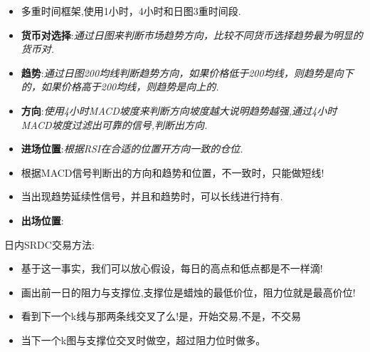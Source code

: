
%


\begin{itemize}
\item 多重时间框架,使用1小时，4小时和日图3重时间段.
\item \textbf{货币对选择}:\textit{通过日图来判断市场趋势方向，比较不同货币选择趋势最为明显的货币对.}
\item \textbf{趋势}:\textit{通过日图200均线判断趋势方向，如果价格低于200均线，则趋势是向下的，如果价格高于200均线，则趋势是向上的.}
\item \textbf{方向}:\textit{使用4小时MACD坡度来判断方向坡度越大说明趋势越强,通过4小时MACD坡度过滤出可靠的信号,判断出方向.}
\item \textbf{进场位置}:\textit{根据RSI在合适的位置开方向一致的仓位.}
\item 根据MACD信号判断出的方向和趋势和位置，不一致时，只能做短线!
\item 当出现趋势延续性信号，并且和趋势时，可以长线进行持有.
\item \textbf{出场位置}:
\end{itemize}


日内SRDC交易方法:
\begin{itemize}
\item 基于这一事实，我们可以放心假设，每日的高点和低点都是不一样滴!
\item 画出前一日的阻力与支撑位,支撑位是蜡烛的最低价位，阻力位就是最高价位!
\item 看到下一个k线与那两条线交叉了么!是，开始交易,不是，不交易
\item 当下一个k图与支撑位交叉时做空，超过阻力位时做多。
\end{itemize}







